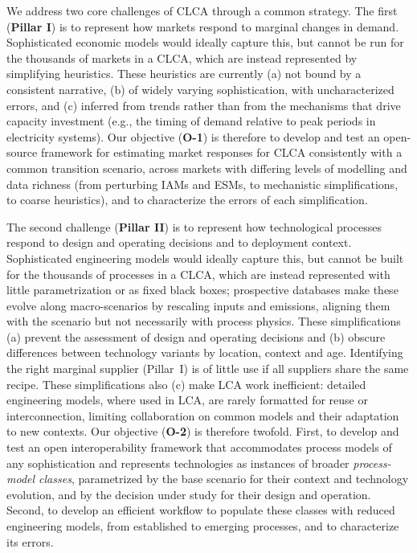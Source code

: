 \documentclass[compact]{nserc} %
\begin{document}
We address two core challenges of CLCA through a common strategy. The first (\textbf{Pillar I}) is to represent how markets respond to marginal changes in demand. Sophisticated economic models would ideally capture this, but cannot be run for the thousands of markets in a CLCA, which are instead represented by simplifying heuristics. These heuristics are currently (a) not bound by a consistent narrative, (b) of widely varying sophistication, with uncharacterized errors, and (c) inferred from trends rather than from the mechanisms that drive capacity investment (e.g., the timing of demand relative to peak periods in electricity systems). Our objective (\textbf{O-1}) is therefore to develop and test an open-source framework for estimating market responses for CLCA consistently with a common transition scenario, across markets with differing levels of modelling and data richness (from perturbing IAMs and ESMs, to mechanistic simplifications, to coarse heuristics), and to characterize the errors of each simplification.

The second challenge (\textbf{Pillar II}) is to represent how technological processes respond to design and operating decisions and to deployment context. Sophisticated engineering models would ideally capture this, but cannot be built for the thousands of processes in a CLCA, which are instead represented with little parametrization or as fixed black boxes; prospective databases make these evolve along macro-scenarios by rescaling inputs and emissions, aligning them with the scenario but not necessarily with process physics. These simplifications (a) prevent the assessment of design and operating decisions and (b) obscure differences between technology variants by location, context and age. Identifying the right marginal supplier (Pillar~I) is of little use if all suppliers share the same recipe. These simplifications also (c) make LCA work inefficient: detailed engineering models, where used in LCA, are rarely formatted for reuse or interconnection, limiting collaboration on common models and their adaptation to new contexts. Our objective (\textbf{O-2}) is therefore twofold. First, to develop and test an open interoperability framework that accommodates process models of any sophistication and represents technologies as instances of broader \emph{process-model classes}, parametrized by the base scenario for their context and technology evolution, and by the decision under study for their design and operation. Second, to develop an efficient workflow to populate these classes with reduced engineering models, from established to emerging processes, and to characterize its errors.
\end{document}

